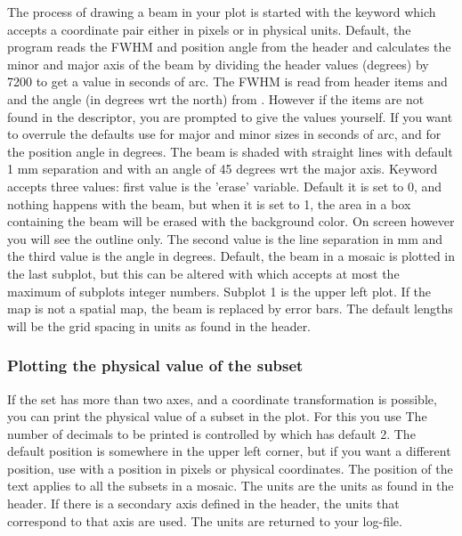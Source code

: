 The process of drawing a beam in your plot is started with
the keyword  which accepts a coordinate pair
either in pixels or in physical units. Default, the
program reads the FWHM and position angle from the header
and calculates the minor and major axis of the beam by
dividing the header values (degrees) by 7200 to get a
value in seconds of arc. The FWHM is read from header
items  and  and the angle (in degrees wrt the 
north) from . However if the items are not found in
the descriptor, you are prompted to give the values
yourself. If you want to overrule the defaults use 
for major and minor sizes in seconds of arc, and  for
the position angle in degrees. The beam is shaded with
straight lines with default 1 mm separation and with an
angle of 45 degrees wrt the major axis. Keyword 
accepts three values: first value is the 'erase' variable. 
Default it is set to 0, and nothing happens with the beam, 
but when it is set to 1, the area in a box containing the 
beam will be erased with the background color. On screen 
however you will see the outline only. The second value
is the line separation in mm and the third value is the 
angle in degrees.              
Default, the beam in a mosaic is plotted in the last subplot, 
but this can be altered with  which accepts at most 
the maximum of subplots integer numbers. Subplot 1 is the 
upper left plot. 
If the map is not a spatial map, the beam is replaced by
error bars. The default lengths will be the grid spacing
in units as found in the header.
              
             
\subsubsection*{Plotting the physical value of the subset}
              
If the set has more than two axes, and a coordinate
transformation is possible, you can print the physical
value of a subset in the plot. For this you use 
The number of decimals to be printed is controlled by
 which has default 2. The default position is
somewhere in the upper left corner, but if you want a
different position, use  with a position in pixels
or physical coordinates. The position of the text applies
to all the subsets in a mosaic. The units are the units as
found in the header. If there is a secondary axis defined
in the header, the units that correspond to that axis are
used. The units are returned to your log-file.

